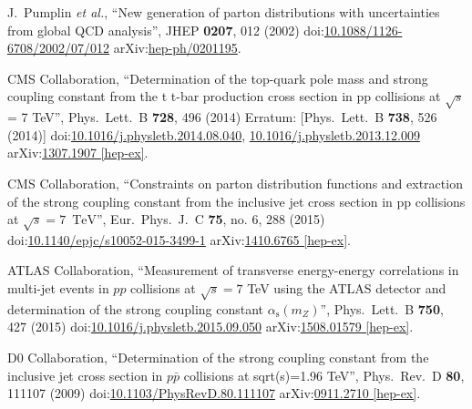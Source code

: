 \begin{thebibliography}{99}

J.~Pumplin {\it et al.}, ``New generation of parton distributions with uncertainties from global QCD analysis'', JHEP {\bf 0207}, 012 (2002) doi:\href{http://dx.doi.org/10.1088/1126-6708/2002/07/012}{10.1088/1126-6708/2002/07/012} arXiv:\href{https://arxiv.org/abs/hep-ph/0201195}{hep-ph/0201195}.



 CMS Collaboration, ``Determination of the top-quark pole mass and strong coupling constant from the t t-bar production cross section in pp collisions at $\sqrt{s}$ = 7 TeV'', Phys.\ Lett.\ B {\bf 728}, 496 (2014) Erratum: [Phys.\ Lett.\ B {\bf 738}, 526 (2014)] doi:\href{http://dx.doi.org/10.1016/j.physletb.2014.08.040}{10.1016/j.physletb.2014.08.040}, \href{http://dx.doi.org/10.1016/j.physletb.2013.12.009}{10.1016/j.physletb.2013.12.009} arXiv:\href{https://arxiv.org/abs/1307.1907}{1307.1907 [hep-ex]}.

CMS Collaboration, ``Constraints on parton distribution functions and extraction of the strong coupling constant from the inclusive jet cross section in pp collisions at $\sqrt{s} = 7$ $\,\text {TeV}$'', Eur.\ Phys.\ J.\ C {\bf 75}, no. 6, 288 (2015) doi:\href{http://dx.doi.org/10.1140/epjc/s10052-015-3499-1}{10.1140/epjc/s10052-015-3499-1} arXiv:\href{https://arxiv.org/abs/1410.6765}{1410.6765 [hep-ex]}.

ATLAS Collaboration, ``Measurement of transverse energy-energy correlations in multi-jet events in $pp$ collisions at $\sqrt{s} = 7$ TeV using the ATLAS detector and determination of the strong coupling constant $\alpha_{\mathrm{s}}(m_Z)$'', Phys.\ Lett.\ B {\bf 750}, 427 (2015) doi:\href{http://dx.doi.org/10.1016/j.physletb.2015.09.050}{10.1016/j.physletb.2015.09.050} arXiv:\href{https://arxiv.org/abs/1508.01579}{1508.01579 [hep-ex]}.

D0 Collaboration, ``Determination of the strong coupling constant from the inclusive jet cross section in $p\bar{p}$ collisions at sqrt(s)=1.96 TeV'', Phys.\ Rev.\ D {\bf 80}, 111107 (2009) doi:\href{http://dx.doi.org/10.1103/PhysRevD.80.111107}{10.1103/PhysRevD.80.111107} arXiv:\href{https://arxiv.org/abs/0911.2710}{0911.2710 [hep-ex]}.


\end{thebibliography}
